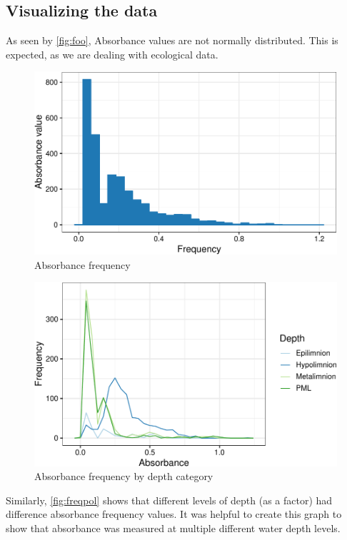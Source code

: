 \documentclass[12pt,]{article}
\begin{document}
\subsection{Visualizing the data}\label{visualizing-the-data}

As seen by \autoref{fig:foo}, Absorbance values are not normally
distributed. This is expected, as we are dealing with ecological data.

\begin{figure}
\centering
\includegraphics{Bash_ENV872_Project_files/figure-latex/foo-1.pdf}
\caption{\label{fig:foo}Absorbance frequency}
\end{figure}

\begin{figure}
\centering
\includegraphics{Bash_ENV872_Project_files/figure-latex/freqpol-1.pdf}
\caption{\label{fig:freqpol}Absorbance frequency by depth category}
\end{figure}

Similarly, \autoref{fig:freqpol} shows that different levels of depth
(as a factor) had difference absorbance frequency values. It was helpful
to create this graph to show that absorbance was measured at multiple
different water depth levels.
\end{document}
